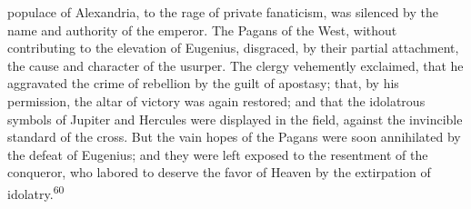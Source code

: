 populace of Alexandria, to the rage of private fanaticism, was
silenced by the name and authority of the emperor. The Pagans of
the West, without contributing to the elevation of Eugenius,
disgraced, by their partial attachment, the cause and character
of the usurper. The clergy vehemently exclaimed, that he
aggravated the crime of rebellion by the guilt of apostasy; that,
by his permission, the altar of victory was again restored; and
that the idolatrous symbols of Jupiter and Hercules were
displayed in the field, against the invincible standard of the
cross. But the vain hopes of the Pagans were soon annihilated by
the defeat of Eugenius; and they were left exposed to the
resentment of the conqueror, who labored to deserve the favor of
Heaven by the extirpation of idolatry.\textsuperscript{60}





